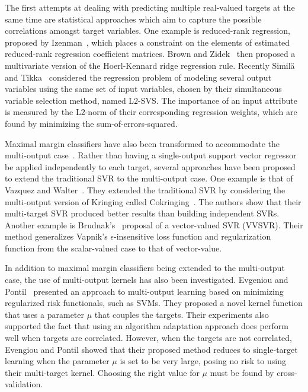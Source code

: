 \documentclass[reqno]{vcuthesis}
\numberwithin{equation}{chapter}
\begin{document}
The first attempts at dealing with predicting multiple real-valued targets at the same time are statistical approaches which aim to capture the possible correlations amongst target variables. One example is reduced-rank regression, proposed by Izenman~\cite{izenman1975reduced}, which places a constraint on the elements of estimated reduced-rank regression coefficient matrices. Brown and Zidek~\cite{brown1980adaptive} then proposed a multivariate version of the Hoerl-Kennard ridge regression rule. Recently Simil{\"a} and Tikka~\cite{simila2007input} considered the regression problem of modeling several output variables using the same set of input variables, chosen by their simultaneous variable selection method, named L$2$-SVS. The importance of an input attribute is measured by the L$2$-norm of their corresponding regression weights, which are found by minimizing the sum-of-errors-squared.

Maximal margin classifiers have also been transformed to accommodate the multi-output case~\cite{tsochantaridis2005large}. Rather than having a single-output support vector regressor be applied independently to each target, several approaches have been proposed to extend the traditional SVR to the multi-output case. One example is that of Vazquez and Walter~\cite{vazquez2003multi}. They extended the traditional SVR by considering the multi-output version of Kringing called Cokringing~\cite{chiles1999}. The authors show that their multi-target SVR produced better results than building independent SVRs. Another example is Brudnak's~\cite{brudnak2006vector} proposal of a vector-valued SVR (VVSVR). Their method generalizes Vapnik's $\epsilon$-insensitive loss function and regularization function from the scalar-valued case to that of vector-value.

In addition to maximal margin classifiers being extended to the multi-output case, the use of multi-output kernels has also been investigated. Evgeniou and Pontil~\cite{evgeniou2004regularized} presented an approach to multi-output learning based on minimizing regularized risk functionals, such as SVMs. They proposed a novel kernel function that uses a parameter $\mu$ that couples the targets. Their experiments also supported the fact that using an algorithm adaptation approach does perform well when targets are correlated. However, when the targets are not correlated, Evengiou and Pontil showed that their proposed method reduces to single-target learning when the parameter $\mu$ is set to be very large, posing no risk to using their multi-target kernel. Choosing the right value for $\mu$ must be found by cross-validation. 
\end{document}
